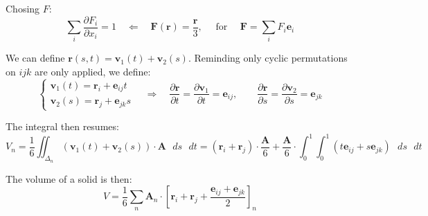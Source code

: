 Chosing $F$:
$$
\sum_i \frac{\partial F_i}{\partial x_i} = 1 \quad\Longleftarrow\quad
\mathbf F(\mathbf r) = \frac{\mathbf r}{3}, \quad\mbox{ for }\quad
\mathbf F = \sum_i F_i \mathbf e_i
$$

We can define $\mathbf r(s, t) = \mathbf v_1(t) + \mathbf v_2 (s)$. Reminding only cyclic permutations on $ijk$ are only applied, we define:
\[
  \begin{cases}
   \mathbf v_1(t) = \mathbf r_i + \mathbf e_{ij}t  \\
   \mathbf v_2(s) = \mathbf r_j + \mathbf e_{jk}s
  \end{cases}
  \quad\Longrightarrow\quad
  \frac{\partial\mathbf r}{\partial t} = \frac{\partial\mathbf v_1}{\partial t} = \mathbf e_{ij}, \quad\quad
  \frac{\partial\mathbf r}{\partial s} = \frac{\partial\mathbf v_2}{\partial s} = \mathbf e_{jk}
\]

The integral then resumes:
$$
V_n = \frac{1}{6}\iint_{\Delta_n}\left( \mathbf v_1(t) + \mathbf v_2(s)\right)\cdot\mathbf A \mbox{ }ds\mbox{ }dt = 
\left(\mathbf r_i + \mathbf r_j\right)\cdot\frac{\mathbf A}{6} + \frac{\mathbf A}{6}\cdot\int_0^1\int_0^1\left( t \mathbf e_{ij} + s \mathbf e_{jk} \right) \mbox{ }ds\mbox{ }dt
$$

The volume of a solid is then:
$$
V = \frac{1}{6}\sum_n\mathbf A_n\cdot\left[ \mathbf r_i + \mathbf r_j + \frac{\mathbf e_{ij} + \mathbf e_{jk}}{2}  \right]_n
$$
\newpage
